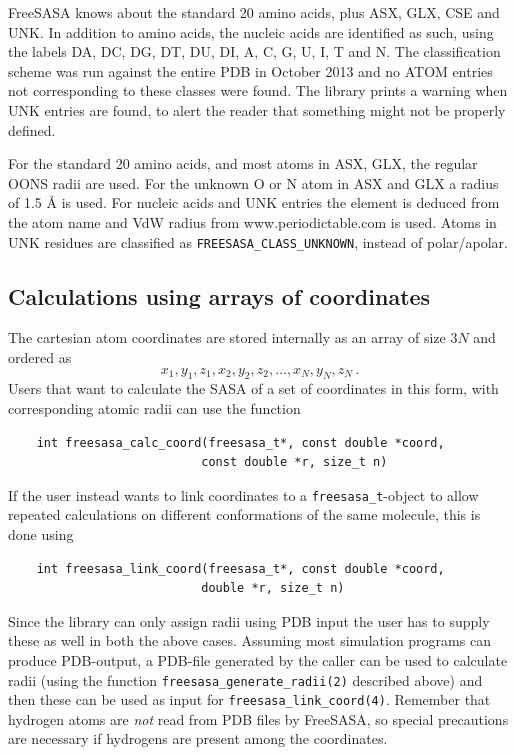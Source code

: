 \documentclass[a4paper,11pt]{article}
\begin{document}
FreeSASA knows about the standard 20 amino acids, plus ASX, GLX,
CSE and UNK. In addition to amino acids, the nucleic acids are
identified as such, using the labels DA, DC, DG, DT, DU, DI, A, C, G,
U, I, T and N. The classification scheme was run against the entire
PDB in October 2013 and no ATOM entries not corresponding to these
classes were found. The library prints a warning when UNK entries are
found, to alert the reader that something might not be properly
defined.

For the standard 20 amino acids, and most atoms in ASX, GLX, the
regular OONS radii \cite{OONS} are used. For the unknown O or N atom in
ASX and GLX a radius of 1.5 Å is used. For nucleic acids and UNK
entries the element is deduced from the atom name and VdW radius from
www.periodictable.com is used. Atoms in UNK residues are classified as
\verb|FREESASA_CLASS_UNKNOWN|, instead of polar/apolar.

\subsection{Calculations using arrays of coordinates}

The cartesian atom coordinates are stored internally as an array of
size $3N$ and ordered as $$x_1,y_1,z_1, x_2,y_2,z_2, \ldots ,x_N,y_N,z_N\,.$$
Users that want to calculate the SASA of a set of coordinates in this form,
with corresponding atomic radii can use the function
\begin{verbatim}
    int freesasa_calc_coord(freesasa_t*, const double *coord, 
                           const double *r, size_t n)
\end{verbatim}
If the user instead wants to link coordinates to a
\verb|freesasa_t|-object to allow repeated calculations on different
conformations of the same molecule, this is done using
\begin{verbatim}
    int freesasa_link_coord(freesasa_t*, const double *coord,
                           double *r, size_t n)
\end{verbatim}

Since the library can only assign radii using PDB input the user has
to supply these as well in both the above cases. Assuming most
simulation programs can produce PDB-output, a PDB-file generated by
the caller can be used to calculate radii (using the function
\verb|freesasa_generate_radii(2)| described above) and then these can
be used as input for \verb|freesasa_link_coord(4)|. Remember that
hydrogen atoms are \emph{not} read from PDB files by FreeSASA, so special
precautions are necessary if hydrogens are present among the
coordinates. 
\end{document}
